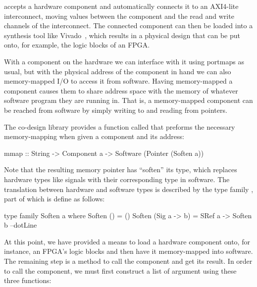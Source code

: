 \documentclass[../paper.tex]{subfiles}
\begin{document}
 accepts a hardware component and automatically connects it to an AXI4-lite interconnect, moving values between the component and the read and write channels of the interconnect. The connected component can then be loaded into a synthesis tool like Vivado~\cite{feist2012}, which results in a physical design that can be put onto, for example, the logic blocks of an FPGA.


With a component on the hardware we can interface with it using portmaps as usual, but with the physical address of the component in hand we can also memory-mapped I/O to access it from software. Having memory-mapped a component causes them to share address space with the memory of whatever software program they are running in. That is, a memory-mapped component can be reached from software by simply writing to and reading from pointers.


The co-design library provides a function called  that preforms the necessary memory-mapping when given a component and its address:

\begin{code}
mmap :: String -> Component a -> Software (Pointer (Soften a))
\end{code}

\noindent Note that the resulting memory pointer has ``soften'' its type, which replaces hardware types like signals with their corresponding type in software. The translation between hardware and software types is described by the type family , part of which is define as follows:

\begin{code}
type family Soften a where
  Soften ()           = ()
  Soften (Sig a -> b) = SRef a -> Soften b
  --dotLine
\end{code}

At this point, we have provided a means to load a hardware component onto, for instance, an FPGA's logic blocks and then have it memory-mapped into software. The remaining step is a method to call the component and get its result. In order to call the component, we must first construct a list of argument using these three functions:
\end{document}

